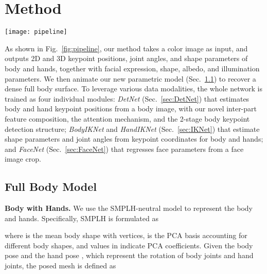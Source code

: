 \documentclass[final]{cvpr}
\begin{document}
 \section{Method}
\begin{figure*}[ht!]
  \centering
  \texttt{[image: pipeline]}
  \caption{
System overview and DetNet structure.
Left: An input image  is first downscaled by 4x for body keypoint detection and face/hand localization.
The hand area is then cropped from  to retrieve \textit{supp-features}, which are concatenated with processed \textit{body-features} for hand keypoint detection.
Here, we use the attention channel to indicate the validity of \textit{body-features}.
Body and hand 3D keypoint positions are fed into \textit{BodyIKNet} and \textit{HandIKNet} to estimate joint angles.
The face area is cropped from  and processed by \textit{FaceNet}.
Finally, the parameters are combined to obtain a full mesh.
Right: The detailed structure of \textit{DetNet}.
Descriptions can be found in Sec.~\ref{sec:DetNet}.
We only illustrate one hand for simplicity.
}
  \label{fig:pipeline}
\end{figure*}
As shown in Fig.~\ref{fig:pipeline}, our method takes a color image as input, and outputs 2D and 3D keypoint positions, joint angles, and shape parameters of body and hands, together with facial expression, shape, albedo, and illumination parameters.
We then animate our new parametric model (Sec.~\ref{sec:mesh}) to recover a dense full body surface.
To leverage various data modalities, the whole network is trained as four individual modules:
\textit{DetNet} (Sec.~\ref{sec:DetNet}) that estimates body and hand keypoint positions from a body image, with our novel inter-part feature composition, the attention mechanism, and the 2-stage body keypoint detection structure;
\textit{BodyIKNet} and \textit{HandIKNet} (Sec.~\ref{sec:IKNet}) that estimate shape parameters and joint angles from keypoint coordinates for body and hands;
and \textit{FaceNet} (Sec.~\ref{sec:FaceNet}) that regresses face parameters from a face image crop.
\subsection{Full Body Model}
\label{sec:mesh}
\noindent \textbf{Body with Hands.}
We use the SMPLH-neutral \cite{romero2017embodied} model to represent the body and hands.
Specifically, SMPLH is formulated as

where  is the mean body shape with  vertices,  is the PCA basis accounting for different body shapes, and values in  indicate PCA coefficients.
Given the body pose  and the hand pose , which represent the rotation of  body joints and  hand joints, the posed mesh is defined as
\end{document}
